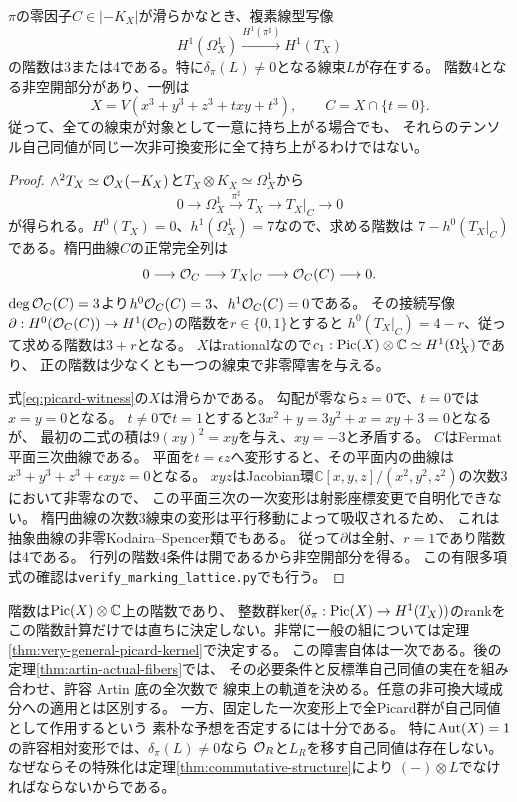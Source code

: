 \begin{theorem}[三次曲面上での非自明性と階数]\label{thm:picard-obstruction-rank}
$\pi$の零因子$C\in|-K_X|$が滑らかなとき、複素線型写像
\[
 H^1(\Omega_X^1)\xrightarrow{H^1(\pi^\sharp)}H^1(T_X)
\]
の階数は3または4である。特に$\delta_\pi(L)\ne0$となる線束$L$が存在する。
階数4となる非空開部分があり、一例は
\begin{equation}\label{eq:picard-witness}
 X=V(x^3+y^3+z^3+txy+t^3),\qquad C=X\cap\{t=0\}.
\end{equation}
従って、全ての線束が対象として一意に持ち上がる場合でも、
それらのテンソル自己同値が同じ一次非可換変形に全て持ち上がるわけではない。
\end{theorem}
\begin{proof}
$\wedge^2T_X\simeq\mathcal O_X(-K_X)$と$T_X\otimes K_X\simeq\Omega_X^1$から
\[
 0\longrightarrow\Omega_X^1\xrightarrow{\pi^\sharp}T_X
 \longrightarrow T_X|_C\longrightarrow0
\]
が得られる。$H^0(T_X)=0$、$h^1(\Omega_X^1)=7$なので、求める階数は
$7-h^0(T_X|_C)$である。楕円曲線$C$の正常完全列は
\[
 0\longrightarrow\mathcal O_C\longrightarrow T_X|_C
 \longrightarrow\mathcal O_C(C)\longrightarrow0.
\]
$\deg\mathcal O_C(C)=3$より$h^0\mathcal O_C(C)=3$、$h^1\mathcal O_C(C)=0$である。
その接続写像$\partial:H^0(\mathcal O_C(C))\to H^1(\mathcal O_C)$の階数を$r\in\{0,1\}$とすると
$h^0(T_X|_C)=4-r$、従って求める階数は$3+r$となる。
$X$はrationalなので$c_1:\operatorname{Pic}(X)\otimes\mathbb C\simeq H^1(\Omega_X^1)$であり、
正の階数は少なくとも一つの線束で非零障害を与える。

式\eqref{eq:picard-witness}の$X$は滑らかである。
勾配が零なら$z=0$で、$t=0$では$x=y=0$となる。
$t\ne0$で$t=1$とすると$3x^2+y=3y^2+x=xy+3=0$となるが、
最初の二式の積は$9(xy)^2=xy$を与え、$xy=-3$と矛盾する。
$C$はFermat平面三次曲線である。
平面を$t=\epsilon z$へ変形すると、その平面内の曲線は
$x^3+y^3+z^3+\epsilon xyz=0$となる。
$xyz$はJacobian環$\mathbb C[x,y,z]/(x^2,y^2,z^2)$の次数3において非零なので、
この平面三次の一次変形は射影座標変更で自明化できない。
楕円曲線の次数3線束の変形は平行移動によって吸収されるため、
これは抽象曲線の非零Kodaira--Spencer類でもある。
従って$\partial$は全射、$r=1$であり階数は4である。
行列の階数4条件は開であるから非空開部分を得る。
この有限多項式の確認は\texttt{verify\_marking\_lattice.py}でも行う。
\end{proof}

\begin{remark}[ここから結論していないこと]
階数は$\operatorname{Pic}(X)\otimes\mathbb C$上の階数であり、
整数群$\ker(\delta_\pi:\operatorname{Pic}(X)\to H^1(T_X))$のrankをこの階数計算だけでは直ちに決定しない。非常に一般の組については定理\ref{thm:very-general-picard-kernel}で決定する。
この障害自体は一次である。後の定理\ref{thm:artin-actual-fibers}では、
その必要条件と反標準自己同値の実在を組み合わせ、許容 Artin 底の全次数で
線束上の軌道を決める。任意の非可換大域成分への適用とは区別する。
一方、固定した一次変形上で全Picard群が自己同値として作用するという
素朴な予想を否定するには十分である。
特に$\operatorname{Aut}(X)=1$の許容相対変形では、$\delta_\pi(L)\ne0$なら
$\mathcal O_R$と$L_R$を移す自己同値は存在しない。
なぜならその特殊化は定理\ref{thm:commutative-structure}により
$(-)\otimes L$でなければならないからである。
\end{remark}


